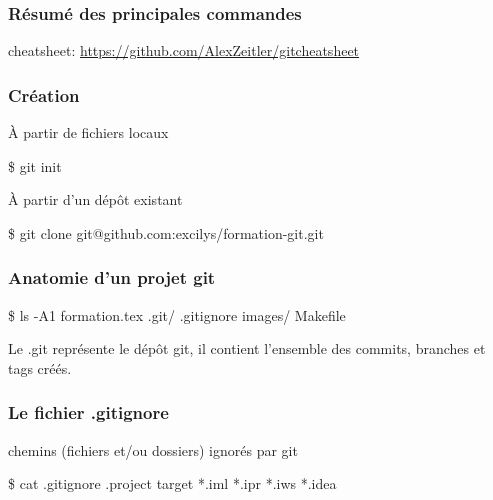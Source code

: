 
\begin{frame}\frametitle{Résumé des principales commandes}
  cheatsheet: \url{https://github.com/AlexZeitler/gitcheatsheet}
\end{frame}
\begin{frame}[fragile]\frametitle{Création}

  \begin{block}{À partir de fichiers locaux}
    \begin{semiverbatim}
\$ \alert{git init}
    \end{semiverbatim}
  \end{block}
  \begin{block}{À partir d'un dépôt existant}
    \begin{semiverbatim}
\$ \alert{git clone git@github.com:excilys/formation-git.git}
    \end{semiverbatim}
  \end{block}

\end{frame}
\begin{frame}[fragile]\frametitle{Anatomie d'un projet git}
  \begin{semiverbatim}
  \$ \alert{ls -A1}
  formation.tex
  \alert{.git/}
  .gitignore
  images/
  Makefile
  \end{semiverbatim}

  Le .git représente le dépôt git, il contient l'ensemble des
  commits, branches et tags créés.
\end{frame}
\begin{frame}[fragile]\frametitle{Le fichier .gitignore}
  chemins (fichiers et/ou dossiers) ignorés par git
  \begin{semiverbatim}
  \$ \alert{cat .gitignore}
  .project
  target
  *.iml
  *.ipr
  *.iws
  *.idea
  \end{semiverbatim}

\end{frame}
